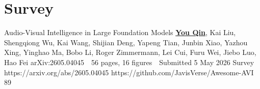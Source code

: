 \section{Survey}

\cvPubListStart

  \cvPub
    {Audio-Visual Intelligence in Large Foundation Models}
    {\underline{\textbf{You Qin}}, Kai Liu, Shengqiong Wu, Kai Wang, Shijian Deng, Yapeng Tian, Junbin Xiao, Yazhou Xing, Yinghao Ma, Bobo Li, Roger Zimmermann, Lei Cui, Furu Wei, Jiebo Luo, Hao Fei}
    {arXiv:2605.04045 \,\textperiodcentered\, 56 pages, 16 figures \,\textperiodcentered\, Submitted 5 May 2026}
    {Survey}
    {https://arxiv.org/abs/2605.04045}
    {https://github.com/JavisVerse/Awesome-AVI}
    {}{}{89}

\cvPubListEnd
